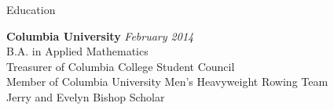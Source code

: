 \documentclass{resume} %
\begin{document}

\begin{rSection}{Education}

{\bf Columbia University} \hfill {\em February 2014} \\ 
B.A. in Applied Mathematics \\
Treasurer of Columbia College Student Council \\
Member of Columbia University Men's Heavyweight Rowing Team \\
Jerry and Evelyn Bishop Scholar \\

\end{rSection}

\end{document}
